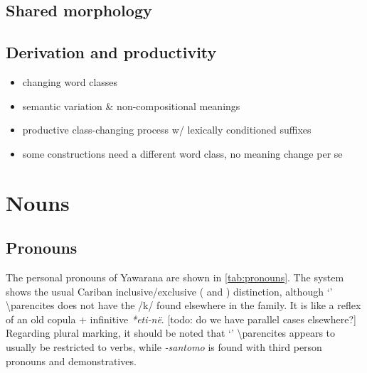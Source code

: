 \documentclass{memoir}
\begin{document}
\section{Shared morphology}

\section{Derivation and productivity}

\begin{itemize}
\tightlist
\item
  changing word classes
\item
  semantic variation \& non-compositional meanings
\item
  productive class-changing process w/ lexically conditioned suffixes
\item
  some constructions need a different word class, no meaning change per
  se
\end{itemize}

\chapter{\texorpdfstring{Nouns \label{nouns}}{Nouns }}

\section{\texorpdfstring{Pronouns \label{sec:pronouns}}{Pronouns }}

The personal pronouns of Yawarana are shown in \cref{tab:pronouns}. The
system shows the usual Cariban inclusive/exclusive ( and
) distinction, although  `'
\textbackslash parencites does not have the /k/ found elsewhere in the
family. It is like a reflex of an old copula + infinitive
\emph{*eti-në}. {[}todo: do we have parallel cases elsewhere?{]}
Regarding plural marking, it should be noted that 
`' \textbackslash parencites appears to usually be restricted to
verbs, while \emph{-santomo} is found with third person pronouns and
demonstratives.
\end{document}
